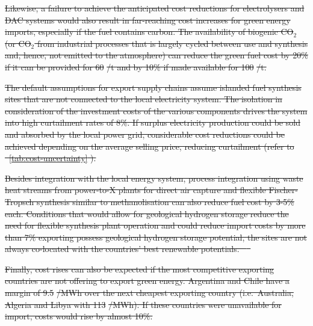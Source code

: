 \documentclass[5p,9pt,draft]{elsarticle}
\providecommand{\DIFdeltex}[1]{{\protect\color{red}\sout{#1}}}                      %
\providecommand{\DIFdel}[1]{\texorpdfstring{\DIFdeltex{#1}}{}} %
\begin{document}
\DIFdel{Likewise, a failure to achieve the anticipated cost reductions for electrolysers
and DAC systems would also result in far-reaching cost increases for green
energy imports, especially if the fuel contains carbon. The availability of
biogenic CO$_2$ (or CO$_2$ from industrial processes that is largely cycled
between use and synthesis and, hence, not emitted to the atmosphere) can reduce
the green fuel cost by 20\% if it can be provided for 60 }%
\DIFdel{/t and by 10\%
if made available for 100 }%
\DIFdel{/t.
}%

\DIFdel{The default assumptions for export supply chains assume islanded fuel synthesis
sites that are not connected to the local electricity system. The isolation in
consideration of the investment costs of the various components drives the
system into high curtailment rates of 8\%. If surplus electricity production
could be sold and absorbed by the local power grid, considerable cost reductions
could be achieved depending on the average selling price, reducing curtailment
(refer to \mbox{%
\cref{tab:cost-uncertainty}}\hskip0pt%
). 
}%

\DIFdel{Besides integration with the local energy system, process integration using
waste heat streams from power-to-X plants for direct air capture and flexible
Fischer-Tropsch synthesis similar to methanolisation can also reduce fuel cost
by 3-5\% each. Conditions that would allow for geological hydrogen storage
reduce the need for flexible synthesis plant operation and could reduce import
costs by more than 7\% %
exporting possess geological hydrogen storage potential, the sites are not
always co-located with the countries' best renewable potentials.
\mbox{%
\cite{hevinUndergroundStorage2019}
}\hskip0pt%
}%

\DIFdel{Finally, cost rises can also be expected if the most competitive exporting
countries are not offering to export green energy. Argentina and Chile have a
margin of 9.5 }%
\DIFdel{/MWh over the next cheapest exporting country
(i.e.~Australia, Algeria and Libya with 113 }%
\DIFdel{/MWh). If these countries
were unavailable for import, costs would rise by almost 10\%.
}%
\end{document}
